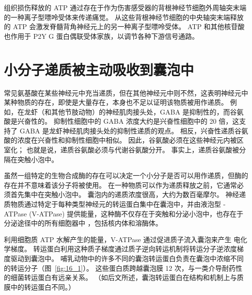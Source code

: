 组织损伤释放的 ATP 通过存在于作为伤害感受器的背根神经节细胞外周轴突末端的一种离子型嘌呤受体来传递痛觉。
从这些背根神经节细胞的中央轴突末端释放的 ATP 会激发脊髓背角神经元上的另一种离子型嘌呤受体。
ATP 和其他核苷酸也作用于 P2Y G 蛋白偶联受体家族，以调节各种下游信号通路。



\section{小分子递质被主动吸收到囊泡中}

常见氨基酸在某些神经元中充当递质，但在其他神经元中则不然，这表明神经元中某种物质的存在，即使是大量存在，本身也不足以证明该物质被用作递质。
例如，在龙虾（和其他节肢动物）的神经肌肉接头处，GABA 是抑制性的，而谷氨酸是兴奋性的。
抑制性细胞中的 GABA 浓度大约是兴奋性细胞中的 20 倍，这支持了 GABA 是龙虾神经肌肉接头处的抑制性递质的观点。
相反，兴奋性递质谷氨酸的浓度在兴奋性和抑制性细胞中相似。
因此，谷氨酸必须在这些神经元内被区室化；
也就是说，递质谷氨酸必须与代谢谷氨酸分开。
事实上，递质谷氨酸被分隔在突触小泡中。


虽然一组特定的生物合成酶的存在可以决定一个小分子是否可以用作递质，但酶的存在并不意味着该分子将被使用。
在一种物质可以作为递质释放之前，它通常必须首先集中在突触小泡中。
囊泡内的递质浓度很高，大约为数百毫摩尔。
神经递质物质通过特定于每种类型神经元的转运蛋白集中在囊泡中，并由液泡型 -ATPase (V-ATPase) 提供能量，这种酶不仅存在于突触和分泌小泡中，也存在于分泌途径中的所有细胞器中 ，包括核内体和溶酶体。


利用细胞质 ATP 水解产生的能量，V-ATPase 通过促进质子流入囊泡来产生  电化学梯度。
转运蛋白利用这种质子梯度通过质子逆向转运机制将转运分子逆浓度梯度驱动到囊泡中。
哺乳动物中的许多不同的囊泡转运蛋白负责在囊泡中浓缩不同的转运分子（图~\ref{fig:16_1}）。
这些蛋白质跨越囊泡膜 12 次，与一类介导耐药性的细菌转运蛋白有远亲关系。
（如后文所述，囊泡转运蛋白在结构和机制上与质膜中的转运蛋白不同。）


